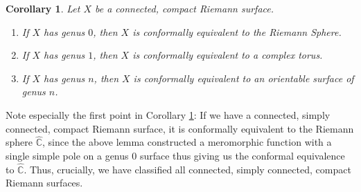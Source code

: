 \documentclass[11pt]{report}
\newtheorem{cor}[thm]{Corollary}
\theoremstyle{definition}
\begin{document}
\begin{cor}\label{ClassificationByGenus}
  Let $X$ be a connected, compact Riemann surface. 
  \begin{enumerate}
    \item If $X$ has genus $0$, then $X$ is conformally equivalent to the Riemann Sphere. 
    \item If $X$ has genus $1$, then $X$ is conformally equivalent to a complex torus.
    \item If $X$ has genus $n$, then $X$ is conformally equivalent to an orientable surface of genus $n$.
  \end{enumerate}
\end{cor}
Note especially the first point in Corollary \ref{ClassificationByGenus}: If we have a connected, simply connected, compact Riemann surface, it is conformally equivalent to the Riemann sphere $\widehat{\mathbb{C}}$, since the above lemma constructed a meromorphic function with a single simple pole on a genus $0$ surface thus giving us the conformal equivalence to $\widehat{\mathbb{C}}$. Thus, crucially, we have classified all connected, simply connected, compact Riemann surfaces.
\end{document}
